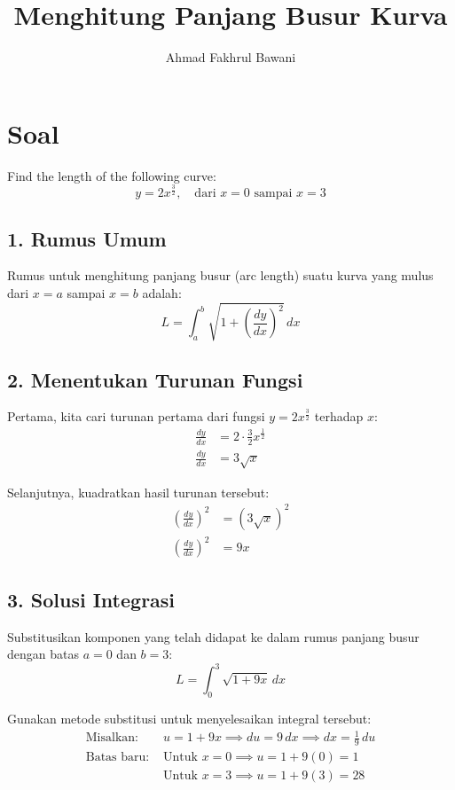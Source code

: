 \documentclass[12pt,a4paper]{article}
\title{Menghitung Panjang Busur Kurva}
\author{Ahmad Fakhrul Bawani}
\date{}
\begin{document}
\maketitle

\section*{Soal}

Find the length of the following curve:
\begin{equation*}
  y = 2x^{\frac{3}{2}}, \quad \text{dari } x = 0 \text{ sampai } x = 3
\end{equation*}

\subsection*{1. Rumus Umum}
Rumus untuk menghitung panjang busur (arc length) suatu kurva yang mulus dari $x = a$ sampai $x = b$ adalah:
\begin{equation*}
  L = \int_{a}^{b} \sqrt{1 + \left(\frac{dy}{dx}\right)^2} \, dx
\end{equation*}

\subsection*{2. Menentukan Turunan Fungsi}
Pertama, kita cari turunan pertama dari fungsi $y = 2x^{\frac{3}{2}}$ terhadap $x$:
\begin{align*}
  \frac{dy}{dx} &= 2 \cdot \frac{3}{2}x^{\frac{1}{2}} \\
  \frac{dy}{dx} &= 3\sqrt{x}
\end{align*}

Selanjutnya, kuadratkan hasil turunan tersebut:
\begin{align*}
  \left(\frac{dy}{dx}\right)^2 &= (3\sqrt{x})^2 \\
  \left(\frac{dy}{dx}\right)^2 &= 9x
\end{align*}

\subsection*{3. Solusi Integrasi}
Substitusikan komponen yang telah didapat ke dalam rumus panjang busur dengan batas $a = 0$ dan $b = 3$:
\begin{equation*}
  L = \int_{0}^{3} \sqrt{1 + 9x} \, dx
\end{equation*}

Gunakan metode substitusi untuk menyelesaikan integral tersebut:
\begin{align*}
  \text{Misalkan: } & u = 1 + 9x \implies du = 9 \, dx \implies dx = \frac{1}{9} \, du \\
  \text{Batas baru: } & \text{Untuk } x = 0 \implies u = 1 + 9(0) = 1 \\
  & \text{Untuk } x = 3 \implies u = 1 + 9(3) = 28
\end{align*}
\end{document}
